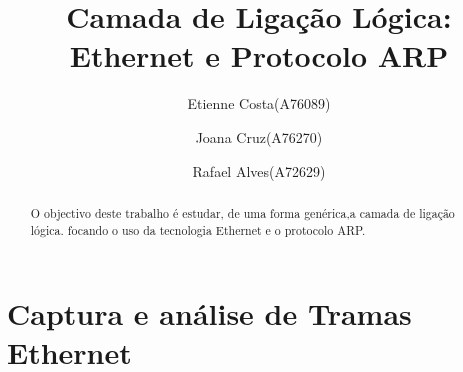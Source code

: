 \documentclass{exam}
\begin{document}
\title{Camada de Ligação Lógica: Ethernet e Protocolo ARP}

\author{Etienne Costa(A76089) \and Joana Cruz(A76270) \and Rafael Alves(A72629)}

\date{}
\maketitle

\begin{abstract}
O objectivo deste trabalho é estudar, de uma forma genérica,a camada de ligação lógica. focando
o uso da tecnologia Ethernet e o protocolo ARP.
\end{abstract}
\section{Captura e análise de Tramas Ethernet}
\end{document}
